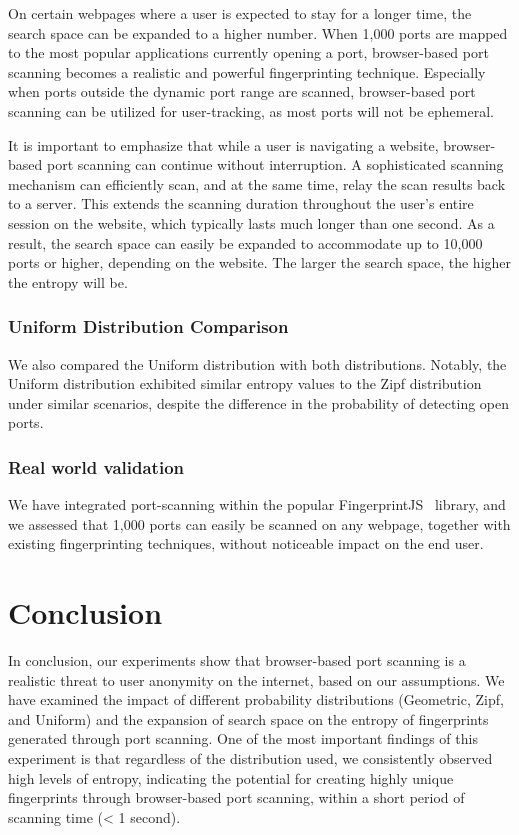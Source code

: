 On certain webpages where a user is expected to stay for a longer time, the search space can be expanded to a higher number. When 1,000 ports are mapped to the most popular applications currently opening a port, browser-based port scanning becomes a realistic and powerful fingerprinting technique. Especially when ports outside the dynamic port range are scanned, browser-based port scanning can be utilized for user-tracking, as most ports will not be ephemeral.

It is important to emphasize that while a user is navigating a website, browser-based port scanning can continue without interruption. A sophisticated scanning mechanism can efficiently scan, and at the same time, relay the scan results back to a server. This extends the scanning duration throughout the user's entire session on the website, which typically lasts much longer than one second. As a result, the search space can easily be expanded to accommodate up to 10,000 ports or higher, depending on the website. The larger the search space, the higher the entropy will be.

\subsubsection{Uniform Distribution Comparison}

We also compared the Uniform distribution with both distributions.
Notably, the Uniform distribution exhibited similar entropy values to the Zipf distribution under similar scenarios, despite the difference in the probability of detecting open ports.

\subsubsection{Real world validation}

We have integrated port-scanning within the popular FingerprintJS~ library, and we assessed that 1,000 ports can easily be scanned on any webpage, together with existing fingerprinting techniques, without noticeable impact on the end user. 


\section{Conclusion}

In conclusion, our experiments show that browser-based port scanning is a realistic threat to user anonymity on the internet, based on our assumptions. We have examined the impact of different probability distributions (Geometric, Zipf, and Uniform) and the expansion of search space on the entropy of fingerprints generated through port scanning.
One of the most important findings of this experiment is that regardless of the distribution used, we consistently observed high levels of entropy, indicating the potential for creating highly unique fingerprints through browser-based port scanning, within a short period of scanning time (< 1 second).

